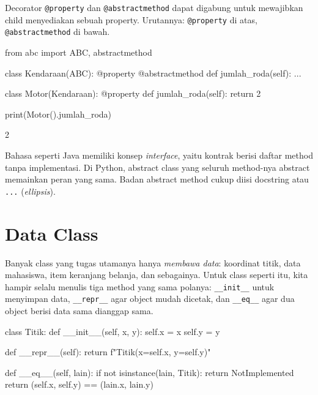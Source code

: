 Decorator \texttt{@property} dan \texttt{@abstractmethod} dapat digabung untuk mewajibkan child menyediakan sebuah property. Urutannya: \texttt{@property} di atas, \texttt{@abstractmethod} di bawah.

\begin{kode}
from abc import ABC, abstractmethod

class Kendaraan(ABC):
    @property
    @abstractmethod
    def jumlah_roda(self):
        ...

class Motor(Kendaraan):
    @property
    def jumlah_roda(self):
        return 2

print(Motor().jumlah_roda)
\end{kode}

\begin{keluaran}
2
\end{keluaran}

\begin{info}
Bahasa seperti Java memiliki konsep \emph{interface}, yaitu kontrak berisi daftar method tanpa implementasi. Di Python, abstract class yang seluruh method-nya abstract memainkan peran yang sama. Badan abstract method cukup diisi docstring atau \texttt{...} (\emph{ellipsis}).
\end{info}

\section{Data Class}

Banyak class yang tugas utamanya hanya \emph{membawa data}: koordinat titik, data mahasiswa, item keranjang belanja, dan sebagainya. Untuk class seperti itu, kita hampir selalu menulis tiga method yang sama polanya: \texttt{\_\_init\_\_} untuk menyimpan data, \texttt{\_\_repr\_\_} agar object mudah dicetak, dan \texttt{\_\_eq\_\_} agar dua object berisi data sama dianggap sama.

\begin{kode}
class Titik:
    def __init__(self, x, y):
        self.x = x
        self.y = y

    def __repr__(self):
        return f"Titik(x={self.x}, y={self.y})"

    def __eq__(self, lain):
        if not isinstance(lain, Titik):
            return NotImplemented
        return (self.x, self.y) == (lain.x, lain.y)
\end{kode}

